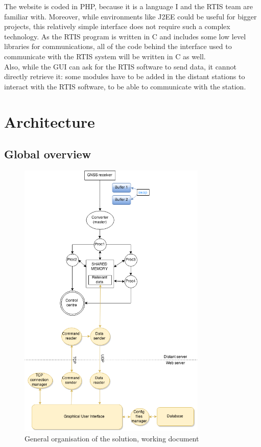 \documentclass{themeensg}
\begin{document}
The website is coded in PHP, because it is a language I and the RTIS team are familiar with. Moreover, while environments like J2EE could be useful for bigger projects, this relatively simple interface does not require such a complex technology.
As the RTIS program is written in C and includes some low level libraries for communications, all of the code behind the interface used to communicate with the RTIS system will be written in C as well.\\

Also, while the GUI can ask for the RTIS software to send data, it cannot directly retrieve it: some modules have to be added in the distant stations to interact with the RTIS software, to be able to communicate with the station.

\section{Architecture}
\subsection{Global overview}

\begin{figure}[!hb]
	\centering
	\includegraphics[width=0.8\textwidth]{global_flowchart}
	\caption{General organisation of the solution, working document}
	\label{generalOrganisation}
\end{figure}
\end{document}
